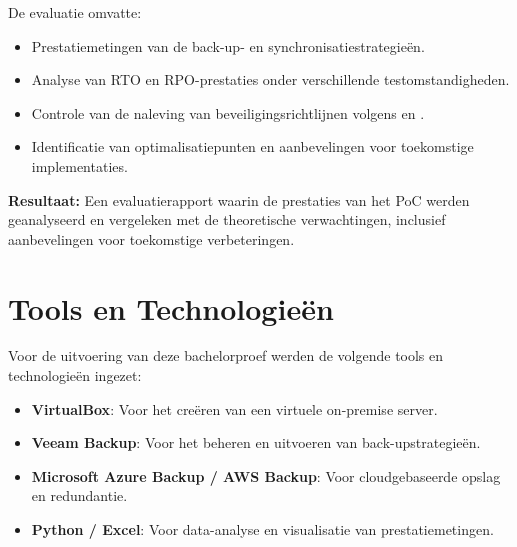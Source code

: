 De evaluatie omvatte:
\begin{itemize}
    \item Prestatiemetingen van de back-up- en synchronisatiestrategieën.
    \item Analyse van RTO en RPO-prestaties onder verschillende testomstandigheden.
    \item Controle van de naleving van beveiligingsrichtlijnen volgens \textcite{ACISAPGSECVEIL001} en \textcite{AD070001}.
    \item Identificatie van optimalisatiepunten en aanbevelingen voor toekomstige implementaties.
\end{itemize}

\textbf{Resultaat:} Een evaluatierapport waarin de prestaties van het PoC werden geanalyseerd en vergeleken met de theoretische verwachtingen, inclusief aanbevelingen voor toekomstige verbeteringen.

\section{Tools en Technologieën}
Voor de uitvoering van deze bachelorproef werden de volgende tools en technologieën ingezet:
\begin{itemize}
    \item \textbf{VirtualBox}: Voor het creëren van een virtuele on-premise server.
    \item \textbf{Veeam Backup}: Voor het beheren en uitvoeren van back-upstrategieën.
    \item \textbf{Microsoft Azure Backup / AWS Backup}: Voor cloudgebaseerde opslag en redundantie.
    \item \textbf{Python / Excel}: Voor data-analyse en visualisatie van prestatiemetingen.
\end{itemize}
